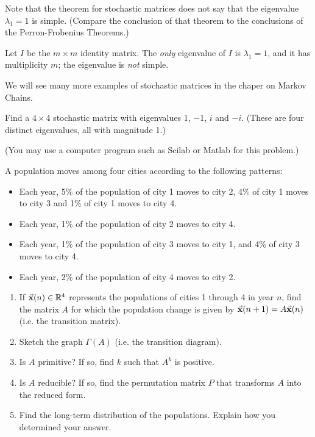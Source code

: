 Note that the theorem for stochastic matrices
does not say that the eigenvalue
$\lambda_1 = 1$ is simple.
(Compare the conclusion of that theorem to the
conclusions of the Perron-Frobenius Theorems.)
\begin{xexample}
Let $I$ be the $m\times m$ identity matrix.
The \emph{only} eigenvalue of $I$ is $\lambda_1 = 1$, and it
has multiplicity $m$; the eigenvalue is \emph{not} simple.
\end{xexample}
We will see many more examples of stochastic matrices
in the chaper on Markov Chains.
%

\newpage
\begin{exercises}
\begin{exercise}
Find a $4\times 4$ stochastic matrix with eigenvalues
$1$, $-1$, $i$ and $-i$.
(These are four distinct eigenvalues, all with magnitude 1.)
\end{exercise}
\begin{exercise}
\label{ex:stoch4cities}
(You may use a computer program such as Scilab or Matlab for this problem.)

A population moves among four cities according to the following patterns:
\begin{itemize}
\item Each year, 5\% of the population of city 1 moves to city 2,
4\% of city 1 moves to city 3 and 1\% of city 1 moves to city 4.
\item Each year, 1\% of the population of city 2 moves to city 4.
\item Each year, 1\% of the population of city 3 moves to city 1,
and 4\% of city 3 moves to city 4.
\item Each year, 2\% of the population of city 4 moves to city 2.
\end{itemize}
\begin{enumerate}
\item If $\vec{\textbf{x}}(n)\in\mathbb{R}^4$ represents the populations of cities 1 through 4
in year $n$, find the matrix $A$ for which the population change is given
by $\vec{\textbf{x}}(n+1) = A\vec{\textbf{x}}(n)$ (i.e. the transition matrix).
\item Sketch the graph $\Gamma(A)$ (i.e. the transition diagram).
\item Is $A$ primitive?  If so, find $k$ such that $A^k$ is positive.
\item Is $A$ reducible? If so, find the permutation matrix $P$ that
transforms $A$ into the reduced form.
\item Find the long-term distribution of the populations.
Explain how you determined your answer.
\end{enumerate}

\end{exercise}
\end{exercises}
%
\newpage
%
